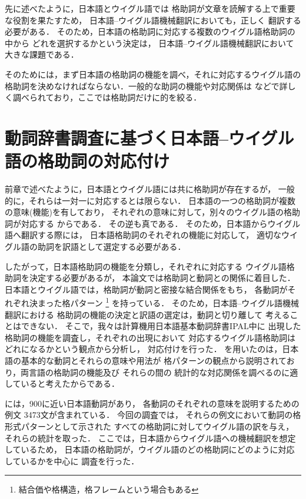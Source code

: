 先に述べたように，日本語とウイグル語では
格助詞が文章を読解する上で重要な役割を果たすため，
日本語--ウイグル語機械翻訳においても，正しく
翻訳する必要がある．
そのため，日本語の格助詞に対応する複数のウイグル語格助詞の中から
どれを選択するかという決定は，
日本語--ウイグル語機械翻訳において大きな課題である．

そのためには，まず日本語の格助詞の機能を調べ，それに対応するウイグル語の
格助詞を決めなければならない．一般的な助詞の機能や対応関係は\cite{NLC93}
などで詳しく調べられており，ここでは格助詞だけに的を絞る．

\section{動詞辞書調査に基づく日本語--ウイグル語の格助詞の対応付け}
前章で述べたように，日本語とウイグル語には共に格助詞が存在するが，
一般的に，それらは一対一に対応するとは限らない．
日本語の一つの格助詞が複数の意味(機能)を有しており，
それぞれの意味に対して，別々のウイグル語の格助詞が対応する
からである．
その逆も真である．
そのため，日本語からウイグル語へ翻訳する際には，
日本語格助詞のそれぞれの機能に対応して，
適切なウイグル語の助詞を訳語として選定する必要がある．

したがって，日本語格助詞の機能を分類し，それぞれに対応する
ウイグル語格助詞を決定する必要があるが，
本論文では格助詞と動詞との関係に着目した．
日本語とウイグル語では，格助詞が動詞と密接な結合関係をもち，
各動詞がそれぞれ決まった格パターン
\footnote{結合価や格構造，格フレームという場合もある}
を持っている．
そのため，日本語--ウイグル語機械翻訳における
格助詞の機能の決定と訳語の選定は，動詞と切り離して
考えることはできない．
そこで，我々は計算機用日本語基本動詞辞書IPAL\cite{IPAL}中に
出現した格助詞の機能を調査し，それぞれの出現において
対応するウイグル語格助詞はどれになるかという観点から分析し，
対応付けを行った．
\cite{IPAL}を用いたのは，日本語の基本的な動詞とそれらの意味や用法が
格パターンの観点から説明されており，両言語の格助詞の機能及び
それらの間の
統計的な対応関係を調べるのに適していると考えたからである．

\cite{IPAL}には，900に近い日本語動詞があり，
各動詞のそれぞれの意味を説明するための例文
3473文が含まれている．
今回の調査では，
それらの例文において動詞の格形式パターンとして示された
すべての格助詞に対してウイグル語の訳を与え，
それらの統計を取った．
ここでは，日本語からウイグル語への機械翻訳を想定しているため，
日本語の格助詞が，ウイグル語のどの格助詞にどのように対応しているかを中心に
調査を行った．

